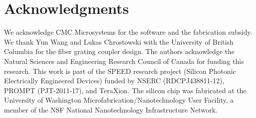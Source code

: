 \documentclass[9pt,twocolumn,twoside]{osajnl}
\begin{document}
	\section*{Acknowledgments}
	We acknowledge CMC Microsystems for the  software and the fabrication subsidy. We thank Yun Wang and Lukas Chrostowski with the University of British Columbia for the fiber grating coupler design. The authors acknowledge the Natural Sciences and Engineering Research Council of Canada for funding this research. This work is part of the SPEED research project (Silicon Photonic Electrically Engineered Devices) funded by NSERC (RDCPJ438811-12), PROMPT (PJT-2011-17), and TeraXion. The silicon chip was fabricated at the University of Washington Microfabrication/Nanotechnology User Facility, a member of the NSF National Nanotechnology Infrastructure Network.
	
	
	
	
\end{document}
